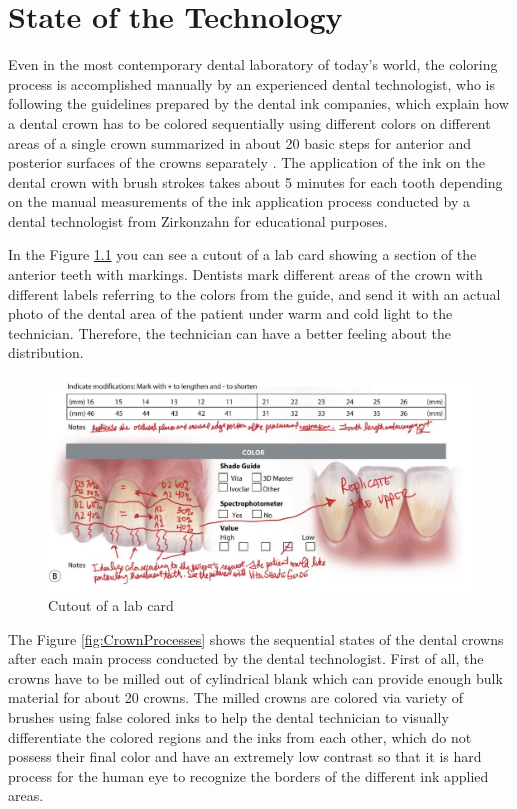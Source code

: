 \chapter{State of the Technology}
\label{sec:stand_technik}
Even in the most contemporary dental laboratory of today's world, the coloring process is accomplished manually by an experienced dental technologist, who is following the guidelines prepared by the dental ink companies, which explain how a dental crown has to be colored sequentially using different colors on different areas of a single crown summarized in about 20 basic steps for anterior and posterior surfaces of the crowns separately \citep{idscad2016}. The application of the ink on the dental crown with brush strokes takes about 5 minutes for each tooth depending on the manual measurements of the ink application process conducted by a dental technologist from Zirkonzahn for educational purposes.

In the Figure \ref{fig:lab_card} you can see a cutout of a lab card showing a section of the anterior teeth with markings. Dentists mark different areas of the crown with different labels referring to the colors from the guide, and send it  with an actual photo of the dental area of the patient under warm and cold light to the technician. Therefore, the technician can have a better feeling about the distribution.

\bigskip

\begin{figure}[H]
	\centering
	\includegraphics[width=1\textwidth]{grafiken/lab_card.jpg}
			\caption{Cutout of a lab card \citep{sharpling2014}}
	\label{fig:lab_card}
\end{figure}

\bigskip

The Figure \ref{fig:CrownProcesses} shows the sequential states of the dental crowns after each main process conducted by the dental technologist. First of all, the crowns have to be milled out of cylindrical blank which can provide enough bulk material for about 20 crowns. The milled crowns are colored via variety of brushes using  false colored inks to help the dental technician to visually differentiate the colored regions and the inks from each other, which do not possess their final color and have an extremely low contrast so that it is hard process for the human eye to recognize the borders of the different ink applied areas.

